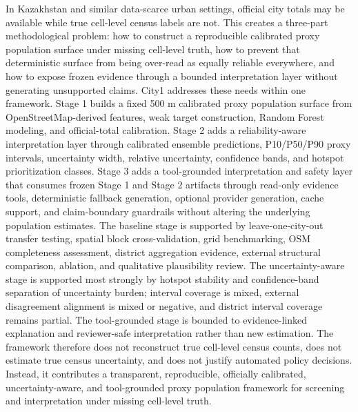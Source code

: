 In Kazakhstan and similar data-scarce urban settings, official city totals may be available while true cell-level census labels are not. This creates a three-part methodological problem: how to construct a reproducible calibrated proxy population surface under missing cell-level truth, how to prevent that deterministic surface from being over-read as equally reliable everywhere, and how to expose frozen evidence through a bounded interpretation layer without generating unsupported claims. City1 addresses these needs within one framework. Stage 1 builds a fixed 500 m calibrated proxy population surface from OpenStreetMap-derived features, weak target construction, Random Forest modeling, and official-total calibration. Stage 2 adds a reliability-aware interpretation layer through calibrated ensemble predictions, P10/P50/P90 proxy intervals, uncertainty width, relative uncertainty, confidence bands, and hotspot prioritization classes. Stage 3 adds a tool-grounded interpretation and safety layer that consumes frozen Stage 1 and Stage 2 artifacts through read-only evidence tools, deterministic fallback generation, optional provider generation, cache support, and claim-boundary guardrails without altering the underlying population estimates. The baseline stage is supported by leave-one-city-out transfer testing, spatial block cross-validation, grid benchmarking, OSM completeness assessment, district aggregation evidence, external structural comparison, ablation, and qualitative plausibility review. The uncertainty-aware stage is supported most strongly by hotspot stability and confidence-band separation of uncertainty burden; interval coverage is mixed, external disagreement alignment is mixed or negative, and district interval coverage remains partial. The tool-grounded stage is bounded to evidence-linked explanation and reviewer-safe interpretation rather than new estimation. The framework therefore does not reconstruct true cell-level census counts, does not estimate true census uncertainty, and does not justify automated policy decisions. Instead, it contributes a transparent, reproducible, officially calibrated, uncertainty-aware, and tool-grounded proxy population framework for screening and interpretation under missing cell-level truth.
